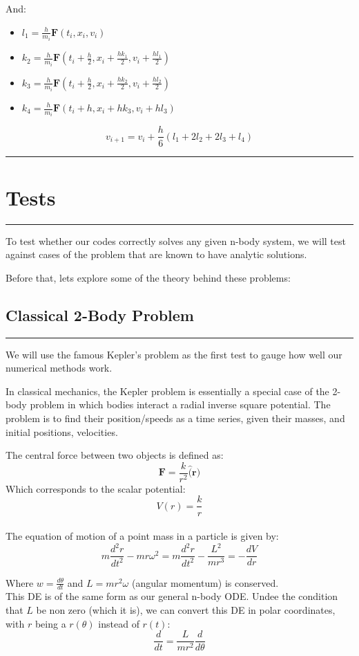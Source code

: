 \documentclass[hidelinks, 11pt, dvipsnames]{article}
\newcommand{\psection}[1]{{
    \begin{center}
        \noindent \rule{17cm}{0.4pt}
        \section*{\LARGE #1}
        \noindent \rule{17cm}{0.4pt}
    \end{center}
}}
\newcommand{\psubsection}[1]{{
    \begin{center}
        \section*{\Large #1}
        \noindent \rule{17cm}{0.2pt}
    \end{center}
}}
\begin{document}
    And:
    \begin{itemize}
        \item $l_{1}=\frac{h}{m_i} \mathbf{F}\left(t_{i}, x_{i}, v_{i}\right)$
        \item $k_{2}=\frac{h}{m_i} \mathbf{F}\left(t_{i} + \frac{h}{2}, x_{i} +\frac{hk_1}{2}, v_{i}+\frac{hl_1}{2}\right)$
        \item $k_{3}=\frac{h}{m_i} \mathbf{F}\left(t_{i} + \frac{h}{2}, x_{i} +\frac{hk_2}{2}, v_{i}+\frac{hl_2}{2}\right)$
        \item $k_{4}=\frac{h}{m_i} \mathbf{F}\left(t_{i}+h, x_{i}+hk_3, v_{i}+hl_3\right)$
    \end{itemize}
    $$ v_{i+1} = v_i + \frac{h}{6} \left( l_1 + 2l_2 + 2l_3 + l_4 \right) $$

    \newpage

    \psection{Tests}
    To test whether our codes correctly solves any given n-body system, we will test against cases of the problem that are known to have analytic solutions.

    Before that, lets explore some of the theory behind these problems:
    \psubsection{Classical 2-Body Problem}

    We will use the famous Kepler's problem as the first test to gauge how well our numerical methods work.

    In classical mechanics, the Kepler problem is essentially a special case of the 2-body problem in which bodies interact a radial inverse square potential. The problem is to find their position/speeds as a time series, given their masses, and initial positions, velocities.

    The central force between two objects is defined as:
    $$ \mathbf{F} = \frac{k}{r^2} \mathbf{\hat(r)} $$
    Which corresponds to the scalar potential:
    $$ V(r) = \frac{k}{r} $$\\
    The equation of motion of a point mass in a particle is given by:
    $$ m\frac{d^2 r}{dt^2} - mr \omega^2 =
    m\frac{d^2 r}{dt^2} - \frac{L^2}{mr^3} = -\frac{dV}{dr} $$

    Where $w = \frac{d\theta}{dt}$ and $L= mr^2 \omega$ (angular momentum) is conserved.\\

    This DE is of the same form as our general n-body ODE. Undee the condition that $L$ be non zero (which it is), we can convert this DE in polar coordinates, with $r$ being a $r(\theta)$ instead of $r(t)$:
    $$ \frac{d}{dt} = \frac{L}{mr^{2}} \frac{d}{d\theta} $$
\end{document}
